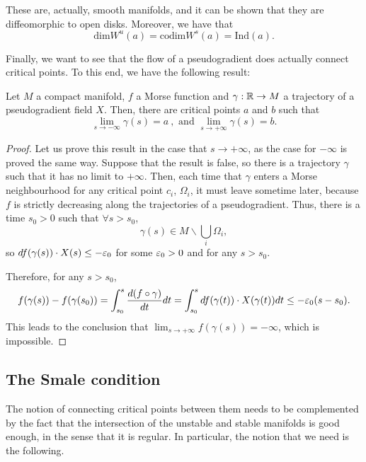 These are, actually, smooth manifolds, and it can be shown that they are diffeomorphic to open disks. Moreover, we have that
$$\text{dim} W^u(a) = \text{codim} W^s(a) = \text{Ind}(a) .$$

Finally, we want to see that the flow of a pseudogradient does actually connect critical points. To this end, we have the following result:

\begin{prop} \label{prop:connect_critical_points}
Let $M$ a compact manifold, $f$ a Morse function and $\gamma : \mathbb{R} \rightarrow M$ a trajectory of a pseudogradient field $X$. Then, there are critical points $a$ and $b$ such that
\begin{displaymath}
\lim_{s \rightarrow - \infty} \gamma(s) = a \ , \text{ and } \lim_{s \rightarrow + \infty} \gamma(s) = b .
\end{displaymath}
\end{prop}

\begin{proof}
Let us prove this result in the case that $s \rightarrow + \infty$, as the case for $- \infty$ is proved the same way. Suppose that the result is false, so there is a trajectory $\gamma$ such that it has no limit to $+ \infty$. Then, each time that $\gamma$ enters a Morse neighbourhood for any critical point $c_i$, $\Omega_i$, it must leave sometime later, because $f$ is strictly decreasing along the trajectories of a pseudogradient. Thus, there is a time $s_0 > 0$ such that $\forall s > s_0$,
$$\gamma(s) \in M \backslash \bigcup_i \Omega_i ,$$
so $d f(\gamma(s)) \cdot X(s) \leq - \varepsilon_0$ for some $\varepsilon_0 > 0$ and for any $s > s_0$.

Therefore, for any $s > s_0$,
\begin{displaymath}
f(\gamma(s))-f(\gamma(s_0)) = \int_{s_0}^s \frac{d (f \circ \gamma)}{d t} d t = \int_{s_0}^s d f(\gamma(t)) \cdot X(\gamma(t)) d t \leq - \varepsilon_0 (s-s_0) .
\end{displaymath}
This leads to the conclusion that $\displaystyle\lim_{s \rightarrow +\infty} f(\gamma(s)) = - \infty$, which is impossible.
\end{proof}

\subsection{The Smale condition}

The notion of connecting critical points between them needs to be complemented by the fact that the intersection of the unstable and stable manifolds is good enough, in the sense that it is regular. In particular, the notion that we need is the following.

